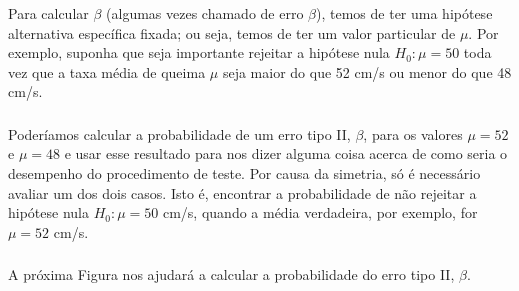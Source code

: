 \documentclass[14pt,aspectratio=1610]{beamer}
\newcommand{\Ho}{\ensuremath{H_{0}}}
\begin{document}
\begin{frame}{}
\frametitle{}
\begin{block}{}
\justifying
Para calcular $\beta$ (algumas vezes chamado de erro $\beta$), temos de ter uma hipótese alternativa específica fixada; ou seja, temos de ter um valor particular de 
$\mu$. Por exemplo, suponha que seja importante rejeitar a hipótese nula $\Ho: \mu = 50$ toda vez que a taxa média de queima $\mu$ seja maior do que 52 cm/s ou 
menor do que 48 cm/s.
\end{block}
\end{frame}

\begin{frame}{}
\frametitle{}
\begin{block}{}
\justifying
Poderíamos calcular a probabilidade de um erro tipo II, $\beta$, para os valores $\mu = 52$ e $\mu = 48$ e usar esse resultado para nos dizer 
alguma coisa acerca de como seria o desempenho do procedimento de teste. Por causa da simetria, só é necessário avaliar um dos dois casos. Isto é, encontrar a 
probabilidade de não rejeitar a hipótese nula $\Ho: \mu = 50$ cm/s, quando a média verdadeira, por exemplo, for $\mu = 52$ cm/s.
\end{block}
\end{frame}

\begin{frame}{}
\frametitle{}
\begin{block}{}
\justifying
A próxima Figura nos ajudará a calcular a probabilidade do erro tipo II, $\beta.$
\end{block}
\begin{center}
\end{center}
\end{frame}
\end{document}
